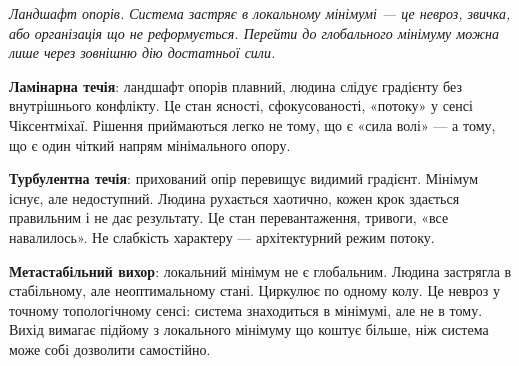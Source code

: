 \documentclass[12pt, a4paper, openany]{book}
\begin{document}
\begin{center}
\medskip
\begin{center}
{\small\itshape Ландшафт опорів. Система застряє в локальному мінімумі — це невроз, звичка, або організація що не реформується. Перейти до глобального мінімуму можна лише через зовнішню дію достатньої сили.}
\end{center}
\end{center}


\textbf{Ламінарна течія}: ландшафт опорів плавний, людина слідує градієнту без внутрішнього конфлікту. Це стан ясності, сфокусованості, «потоку» у сенсі Чіксентміхаї. Рішення приймаються легко не тому, що є «сила волі» --- а тому, що є один чіткий напрям мінімального опору.

\textbf{Турбулентна течія}: прихований опір перевищує видимий градієнт. Мінімум існує, але недоступний. Людина рухається хаотично, кожен крок здається правильним і не дає результату. Це стан перевантаження, тривоги, «все навалилось». Не слабкість характеру --- архітектурний режим потоку.

\textbf{Метастабільний вихор}: локальний мінімум не є глобальним. Людина застрягла в стабільному, але неоптимальному стані. Циркулює по одному колу. Це невроз у точному топологічному сенсі: система знаходиться в мінімумі, але не в тому. Вихід вимагає підйому з локального мінімуму що коштує більше, ніж система може собі дозволити самостійно.
\end{document}
